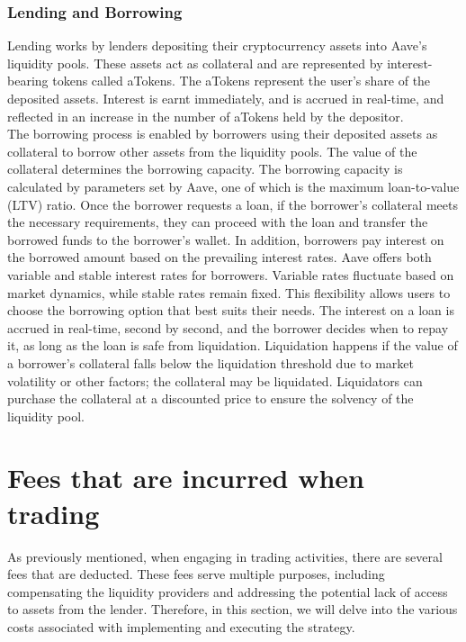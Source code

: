 \subsubsection{Lending and Borrowing}
Lending works by lenders depositing their cryptocurrency assets into Aave's liquidity pools. These assets act as collateral and are represented by interest-bearing tokens called aTokens. The aTokens represent the user's share of the deposited assets. Interest is earnt immediately, and is accrued in real-time, and reflected in an increase in the number of aTokens held by the depositor.
\\[3mm]
The borrowing process is enabled by borrowers using their deposited assets as collateral to borrow other assets from the liquidity pools. The value of the collateral determines the borrowing capacity. The borrowing capacity is calculated by parameters set by Aave, one of which is the maximum loan-to-value (LTV) ratio. Once the borrower requests a loan, if the borrower's collateral meets the necessary requirements, they can proceed with the loan and transfer the borrowed funds to the borrower's wallet. In addition, borrowers pay interest on the borrowed amount based on the prevailing interest rates. Aave offers both variable and stable interest rates for borrowers. Variable rates fluctuate based on market dynamics, while stable rates remain fixed. This flexibility allows users to choose the borrowing option that best suits their needs. The interest on a loan is accrued in real-time, second by second, and the borrower decides when to repay it, as long as the loan is safe from liquidation. Liquidation happens if the value of a borrower's collateral falls below the liquidation threshold due to market volatility or other factors; the collateral may be liquidated. Liquidators can purchase the collateral at a discounted price to ensure the solvency of the liquidity pool.

\section{Fees that are incurred when trading}
As previously mentioned, when engaging in trading activities, there are several fees that are deducted. These fees serve multiple purposes, including compensating the liquidity providers and addressing the potential lack of access to assets from the lender. Therefore, in this section, we will delve into the various costs associated with implementing and executing the strategy.

